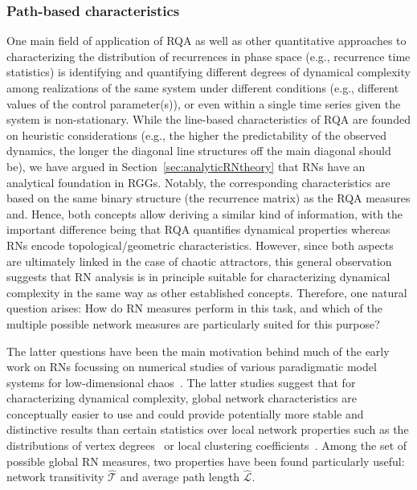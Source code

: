		\subsubsection{Path-based characteristics}
		One main field of application of RQA as well as other quantitative approaches to characterizing the distribution of recurrences in phase space (e.g., recurrence time statistics) is identifying and quantifying different degrees of dynamical complexity among realizations of the same system under different conditions (e.g., different values of the control parameter(s)), or even within a single time series given the system is non-stationary. While the line-based characteristics of RQA are founded on heuristic considerations (e.g., the higher the predictability of the observed dynamics, the longer the diagonal line structures off the main diagonal should be), we have argued in Section~\ref{sec:analyticRNtheory} that RNs have an analytical foundation in RGGs. Notably, the corresponding characteristics are based on the same binary structure (the recurrence matrix) as the RQA measures and. Hence, both concepts allow deriving a similar kind of information, with the important difference being that RQA quantifies dynamical properties whereas RNs encode topological/geometric characteristics. However, since both aspects are ultimately linked in the case of chaotic attractors, this general observation suggests that RN analysis is in principle suitable for characterizing dynamical complexity in the same way as other established concepts. Therefore, one natural question arises: How do RN measures perform in this task, and which of the multiple possible network measures are particularly suited for this purpose?

		The latter questions have been the main motivation behind much of the early work on RNs focussing on numerical studies of various paradigmatic model systems for low-dimensional chaos~\cite{Donner2010Nolta,Donner2011,Donner2010b,Donner2010a,Marwan2009,Zou2010,Zou2012c}. The latter studies suggest that for characterizing dynamical complexity, global network characteristics are conceptually easier to use and could provide potentially more stable and distinctive results than certain statistics over local network properties such as the distributions of vertex degrees~\cite{Zou2012b} or local clustering coefficients~\cite{Zou2012c}. Among the set of possible global RN measures, two properties have been found particularly useful: network transitivity $\hat{\mathcal{T}}$ and average path length $\hat{\mathcal{L}}$.

